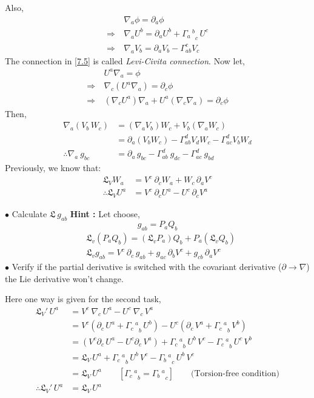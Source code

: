 \documentclass[14pt]{article} %
\begin{document}
Also,
\begin{align*}
& \nabla_a \phi = \partial_a \phi \\
\Rightarrow~ &\nabla_a U^b = \partial_a U^b + {\Gamma_a\,^b}_{c}\, U^c \tag{7.5} \label{7.5} \\
\Rightarrow~ & \nabla_a V_b = \partial_a V_b - \Gamma_{ab}^c V_c
\end{align*}
The connection in \eqref{7.5} is called \textit{Levi-Civita connection}. Now let,
\begin{align*}
& U^a \nabla_a = \phi \\
\Rightarrow~ & \nabla_c (U^a \nabla_a) = \partial_c \phi \\
\Rightarrow~ & (\nabla_c U^a)\nabla_a + U^a (\nabla_c \nabla_a) = \partial_c \phi
\end{align*}
Then,
\begin{align*}
\nabla_a (V_b\,W_c) &= (\nabla_a V_b) W_c + V_b (\nabla_a W_c) \\
&= \partial_a (V_b W_c) - \Gamma^d_{ab} V_d W_c - \Gamma^d_{ac} V_b W_d \\
\therefore \nabla_a~g_{bc} &= \partial_a\,g_{bc} - \Gamma^d_{ab}~g_{dc} - \Gamma^d_{ac}~g_{bd} 
\end{align*}
Previously, we know that:
\begin{align*}
\mathfrak{L}_V W_a &= V^c~\partial_c W_a + W_c\, \partial_a V^c \\
\therefore \mathfrak{L}_V U^a &= V^c~ \partial_c U^a - U^c\, \partial_c V^a
\end{align*}
\begin{tcolorbox}[ title=HW]
$\bullet$ Calculate $\mathfrak{L}~g_{ab}$
\textbf{Hint :} Let choose, 
\[ g_{ab} = P_a Q_b \]
\begin{align*}
& \mathfrak{L}_v (P_a Q_b) = (\mathfrak{L}_vP_a) Q_b + P_a (\mathfrak{L}_v Q_b) \\
& \mathfrak{L}_v g_{ab} = V^c~ \partial_c\, g_{ab} + g_{ac}\, \partial_b V^c + g_{cb}\, \partial_a V^c
\end{align*}
$\bullet$ Verify if the partial derivative is switched with the covariant derivative ($\partial \rightarrow\nabla$) the Lie derivative won't change.
\end{tcolorbox}
Here one way is given for the second task,
\begin{align*}
\mathfrak{L}_V'\,U^a &= V^c~ \nabla_c \, U^a - U^c~ \nabla_c \,V^a \\
&= V^c (\partial_c\, U^a + {\Gamma_c\,^a}_b\,U^b) - U^c (\partial_c\, V^a + {\Gamma_c\,^a}_b\,V^b) \\
&= (V^c \partial_c\, U^a - U^c \partial_c\, V^a ) + {\Gamma_c\,^a}_b\,U^b \, V^c - {\Gamma_c\,^a}_b\,U^c \, V^b \\
&= \mathfrak{L}_V\, U^a + {\Gamma_c\,^a}_b\,U^b \, V^c - {\Gamma_b\,^a}_c\,U^b \, V^c \\
&= \mathfrak{L}_V\, U^a \quad \quad [ {\Gamma_c\,^a}_b = {\Gamma_b\,^a}_c ] \quad \quad \text{(Torsion-free condition)}\\
\therefore \mathfrak{L}_V '\, U^a &= \mathfrak{L}_V\, U^a
\end{align*}
\end{document}
